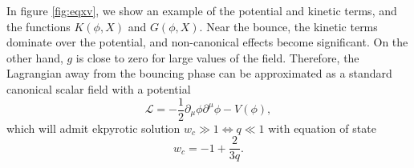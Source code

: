 \documentclass[12pt,a4paper]{article}
\numberwithin{equation}{section}
\numberwithin{equation}{section}
\begin{document}
In figure \ref{fig:eqxv}, we show an example of the potential and kinetic terms, and the functions $K(\phi,X)$ and $G(\phi,X)$. Near the bounce, the kinetic terms dominate over the potential, and non-canonical effects become significant. 
On the other hand, $g$ is close to zero for large values of the field. Therefore, the Lagrangian away from the bouncing phase can be approximated as a standard canonical scalar field with a potential
\begin{equation}
    \mathcal{L} = -\frac{1}{2} \partial_{\mu} \phi \partial^{\mu} \phi -V(\phi),
\end{equation}
which will admit ekpyrotic solution $w_c \gg1 \Leftrightarrow q \ll 1$ with equation of state
\begin{equation}
    w_c = -1+ \frac{2}{3q}. 
    \label{eq:ekpw}
    \end{equation}
 
\end{document}
